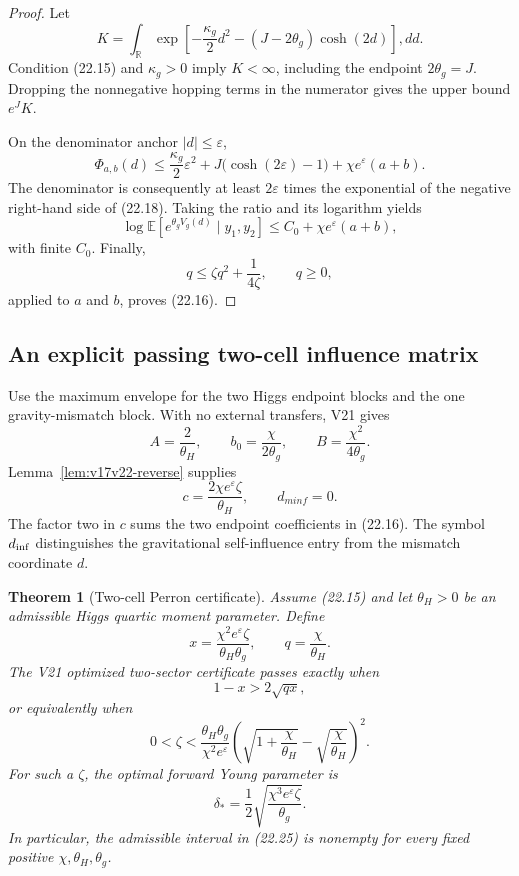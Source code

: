 \documentclass[11pt]{article}
\newtheorem{theorem}{Theorem}[section]
\theoremstyle{remark}
\begin{document}
\begin{proof}
Let
\[
 K=\int_{\mathbb R}
 \exp\left[-\frac{\kappa_g}{2}d^2
 -(J-2\theta_g)\cosh(2d)\right],dd.              \tag{22.17}
\]
Condition (22.15) and \(\kappa_g>0\) imply \(K<\infty\), including
the endpoint \(2\theta_g=J\).  Dropping the nonnegative hopping terms
in the numerator gives the upper bound \(e^JK\).

On the denominator anchor \(|d|\leq\varepsilon\),
\[
 \Phi_{a,b}(d)
 \leq\frac{\kappa_g}{2}\varepsilon^2
 +J\bigl(\cosh(2\varepsilon)-1\bigr)
 +\chi e^{\varepsilon}(a+b).                      \tag{22.18}
\]
The denominator is consequently at least \(2\varepsilon\) times the
exponential of the negative right-hand side of (22.18).  Taking the
ratio and its logarithm yields
\[
 \log\mathbb E\left[e^{\theta_gV_g(d)}\mid y_1,y_2\right]
 \leq C_0+\chi e^{\varepsilon}(a+b),               \tag{22.19}
\]
with finite \(C_0\).  Finally,
\[
 q\leq\zeta q^2+\frac{1}{4\zeta},
 \qquad q\geq0,                                   \tag{22.20}
\]
applied to \(a\) and \(b\), proves (22.16).
\end{proof}

\subsection{An explicit passing two-cell influence matrix}

Use the maximum envelope for the two Higgs endpoint blocks and the one
gravity-mismatch block.  With no external transfers, V21 gives
\[
 A=\frac{2}{\theta_H},\qquad
 b_0=\frac{\chi}{2\theta_g},\qquad
 B=\frac{\chi^2}{4\theta_g}.                       \tag{22.21}
\]
Lemma~\ref{lem:v17v22-reverse} supplies
\[
 c=\frac{2\chi e^{\varepsilon}\zeta}{\theta_H},
 \qquad d_{
m inf}=0.                             \tag{22.22}
\]
The factor two in \(c\) sums the two endpoint coefficients in
(22.16).  The symbol \(d_{\rm inf}\) distinguishes the gravitational
self-influence entry from the mismatch coordinate \(d\).

\begin{theorem}[Two-cell Perron certificate]
\label{thm:v17v22-perron}
Assume (22.15) and let \(\theta_H>0\) be an admissible Higgs quartic
moment parameter.  Define
\[
 x=\frac{\chi^2e^{\varepsilon}\zeta}
 {\theta_H\theta_g},
 \qquad q=\frac{\chi}{\theta_H}.                  \tag{22.23}
\]
The V21 optimized two-sector certificate passes exactly when
\[
 1-x>2\sqrt{qx},                                   \tag{22.24}
\]
or equivalently when
\[
\boxed{
 0<\zeta<
 \frac{\theta_H\theta_g}{\chi^2e^{\varepsilon}}
 \left(\sqrt{1+\frac{\chi}{\theta_H}}
 -\sqrt{\frac{\chi}{\theta_H}}\right)^2.}         \tag{22.25}
\]
For such a \(\zeta\), the optimal forward Young parameter is
\[
 \delta_*
 =\frac12\sqrt{\frac{\chi^3e^{\varepsilon}\zeta}
 {\theta_g}}.                                      \tag{22.26}
\]
In particular, the admissible interval in (22.25) is nonempty for
every fixed positive \(\chi,\theta_H,\theta_g\).
\end{theorem}
\end{document}
